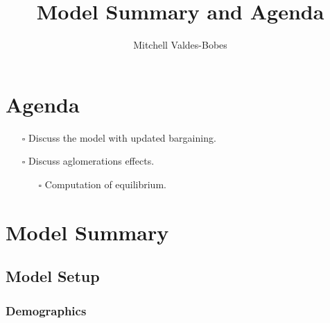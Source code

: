 \documentclass[
  letterpaper,
  DIV=11,
  numbers=noendperiod]{scrartcl}
\title{Model Summary and Agenda}
\author{Mitchell Valdes-Bobes}
\date{}
\providecommand{\tightlist}{%
  \setlength{\itemsep}{0pt}\setlength{\parskip}{0pt}}\usepackage{longtable,booktabs,array}
\begin{document}
\maketitle
\ifdefined\Shaded\renewenvironment{Shaded}{\begin{tcolorbox}[boxrule=0pt, enhanced, sharp corners, breakable, frame hidden, interior hidden, borderline west={3pt}{0pt}{shadecolor}]}{\end{tcolorbox}}\fi

\hypertarget{agenda}{%
\section{Agenda}\label{agenda}}

\begin{itemize}
\tightlist
\item[$\square$]
  Discuss the model with updated bargaining.
\item[$\square$]
  Discuss aglomerations effects.

  \begin{itemize}
  \tightlist
  \item[$\square$]
    Computation of equilibrium.
  \end{itemize}
\end{itemize}

\hypertarget{model-summary}{%
\section{Model Summary}\label{model-summary}}

\hypertarget{model-setup}{%
\subsection{Model Setup}\label{model-setup}}

\hypertarget{demographics}{%
\subsubsection{Demographics}\label{demographics}}
\end{document}
